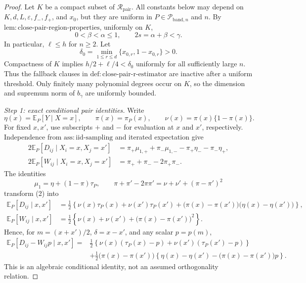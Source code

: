 \documentclass{article}
\begin{document}
\begin{proof}
Let \(K\) be a compact subset of \(\mathcal R_{\mathrm{pair}}\).  All constants below may depend on \(K,d,L,\varepsilon,f_{-},f_{+}\), and \(x_0\), but they are uniform in \(P\in\mathcal P_{\mathrm{band},n}\) and \(n\).  By \(\mathrm{lem:close\mbox{-}pair\mbox{-}region\mbox{-}properties}\), uniformly on \(K\),
\[
0<\beta<\alpha\leq1,
\qquad 2s=\alpha+\beta<\gamma.
\tag{1}
\]
In particular, \(\ell\leq h\) for \(n\geq2\).  Let
\[
\delta_0=\min_{1\leq r\leq d}\{x_{0,r},1-x_{0,r}\}>0.
\]
Compactness of \(K\) implies \(h/2+\ell/4<\delta_0\) uniformly for all sufficiently large \(n\).  Thus the fallback clauses in \(\mathrm{def:close\mbox{-}pair\mbox{-}r\mbox{-}estimator}\) are inactive after a uniform threshold.  Only finitely many polynomial degrees occur on \(K\), so the dimension and supremum norm of \(b_\gamma\) are uniformly bounded.

\emph{Step 1: exact conditional pair identities.}
Write
\[
\eta(x)=\mathbb E_P[Y\mid X=x],
\qquad \pi(x)=\pi_P(x),
\qquad \nu(x)=\pi(x)\{1-\pi(x)\}.
\]
For fixed \(x,x'\), use subscripts \(+\) and \(-\) for evaluation at \(x\) and \(x'\), respectively.  Independence from \(\mathrm{ass:iid\mbox{-}sampling}\) and iterated expectation give
\[
\begin{aligned}
2\mathbb E_P[D_{ij}\mid X_i=x,X_j=x']
&=\pi_+\mu_{1,+}+\pi_-\mu_{1,-}
-\pi_+\eta_- -\pi_-\eta_+,\\
2\mathbb E_P[W_{ij}\mid X_i=x,X_j=x']
&=\pi_++\pi_- -2\pi_+\pi_-.
\end{aligned}
\tag{2}
\]
The identities
\[
\mu_1=\eta+(1-\pi)\tau_P,
\qquad
\pi+\pi'-2\pi\pi'=\nu+\nu'+(\pi-\pi')^2
\]
transform (2) into
\[
\begin{aligned}
\mathbb E_P[D_{ij}\mid x,x']
&=\frac12\left\{
\nu(x)\tau_P(x)+\nu(x')\tau_P(x')
+\bigl(\pi(x)-\pi(x')\bigr)
\bigl(\eta(x)-\eta(x')\bigr)
\right\},\\
\mathbb E_P[W_{ij}\mid x,x']
&=\frac12\left\{
\nu(x)+\nu(x')+\bigl(\pi(x)-\pi(x')\bigr)^2
\right\}.
\end{aligned}
\tag{3}
\]
Hence, for \(m=(x+x')/2\), \(\delta=x-x'\), and any scalar \(p=p(m)\),
\[
\begin{aligned}
\mathbb E_P[D_{ij}-W_{ij}p\mid x,x']
={}&\frac12\left\{
\nu(x)(\tau_P(x)-p)+\nu(x')(\tau_P(x')-p)
\right\}\\
&+\frac12\bigl(\pi(x)-\pi(x')\bigr)
\left\{
\eta(x)-\eta(x')-\bigl(\pi(x)-\pi(x')\bigr)p
\right\}.
\end{aligned}
\tag{4}
\]
This is an algebraic conditional identity, not an assumed orthogonality relation.


\end{proof}
\end{document}
